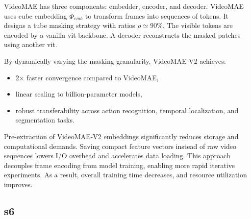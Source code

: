 VideoMAE has three components: embedder, encoder, and decoder. VideoMAE uses cube embedding \(\Phi_{emb}\) to transform frames into sequences of tokens. It designs a tube masking strategy with ratios \(\rho \simeq 90\%\). The visible tokens are encoded by a vanilla \acrshort{vit} backbone. A decoder reconstructs the masked patches using another \acrshort{vit}\cite{wang_videomae_2023}. 

By dynamically varying the masking granularity, VideoMAE‑V2 achieves:
\begin{itemize}
    \item 2× faster convergence compared to VideoMAE,
    \item linear scaling to billion‑parameter models,
    \item robust transferability across action recognition, temporal localization, and segmentation tasks\cite{wang_videomae_2023}.
\end{itemize}

Pre-extraction of VideoMAE-V2 embeddings significantly reduces storage and computational demands. Saving compact feature vectors instead of raw video sequences lowers I/O overhead and accelerates data loading. This approach decouples frame encoding from model training, enabling more rapid iterative experiments. As a result, overall training time decreases, and resource utilization improves. 

\subsection{\acrfull{s6}}
\label{ssec:s6}

